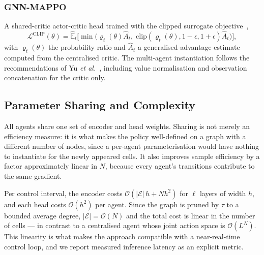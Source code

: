 \documentclass[journal]{IEEEtran}
\begin{document}
\subsubsection{GNN-MAPPO} A shared-critic actor-critic head trained with
the clipped surrogate objective~\cite{schulman2017ppo},
\begin{equation}
\mathcal{L}^{\mathrm{CLIP}}(\theta) = \hat{\mathbb{E}}_t\Big[
\min\big(\varrho_t(\theta)\hat{A}_t,\;
\mathrm{clip}(\varrho_t(\theta), 1-\epsilon, 1+\epsilon)\hat{A}_t\big)\Big],
\end{equation}
with $\varrho_t(\theta)$ the probability ratio and $\hat{A}_t$ a
generalised-advantage estimate computed from the centralised critic.
The multi-agent instantiation follows the recommendations of Yu
\emph{et al.}~\cite{yu2022mappo}, including value normalisation and
observation concatenation for the critic only.

\subsection{Parameter Sharing and Complexity}
All agents share one set of encoder and head weights. Sharing is not
merely an efficiency measure: it is what makes the policy well-defined
on a graph with a different number of nodes, since a per-agent
parameterisation would have nothing to instantiate for the newly
appeared cells. It also improves sample efficiency by a factor
approximately linear in $N$, because every agent's transitions
contribute to the same gradient.

Per control interval, the encoder costs
$\mathcal{O}(|\mathcal{E}|\,h + N h^2)$ for $\ell$ layers of width $h$,
and each head costs $\mathcal{O}(h^2)$ per agent. Since the graph is
pruned by $\tau$ to a bounded average degree, $|\mathcal{E}| =
\mathcal{O}(N)$ and the total cost is linear in the number of cells ---
in contrast to a centralised agent whose joint action space is
$\mathcal{O}(L^N)$. This linearity is what makes the approach
compatible with a near-real-time control loop, and we report measured
inference latency as an explicit metric.
\end{document}
